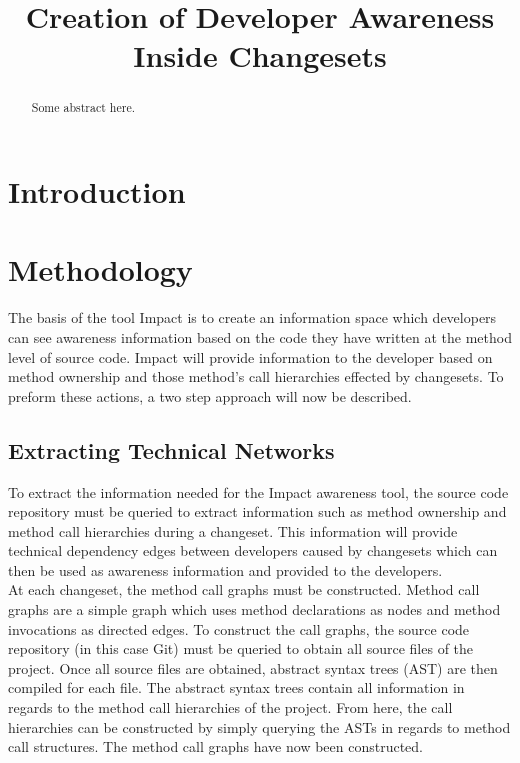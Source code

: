 \documentclass[conference]{IEEEtran}
\begin{document}
\title{Creation of Developer Awareness Inside Changesets}

\author{
}

\maketitle

\begin{abstract}
Some abstract here.
\end{abstract}

\section{Introduction}

\section{Methodology}

The basis of the tool Impact is to create an information space which developers can see awareness information
based on the code they have written at the method level of source code. Impact will provide information to the
developer based on method ownership and those method's call hierarchies effected by changesets.  To preform
these actions, a two step approach will now be described. \\

\subsection{Extracting Technical Networks}
To extract the information needed for the Impact awareness tool, the source code repository must be queried to
extract information such as method ownership and method call hierarchies during a changeset. This information
will provide technical dependency edges between developers caused by changesets which can then be used as
awareness information and provided to the developers. \\

At each changeset, the method call graphs must be constructed. Method call graphs are a simple graph which uses
method declarations as nodes and method invocations as directed edges. To construct the call graphs, the source 
code repository (in this case Git) must be queried to obtain all source files of the project. Once all source files are
obtained, abstract syntax trees (AST) are then compiled for each file. The abstract syntax trees contain all information
in regards to the method call hierarchies of the project. From here, the call hierarchies can be constructed by simply
querying the ASTs in regards to method call structures. The method call graphs have now been constructed.\\
\end{document}
